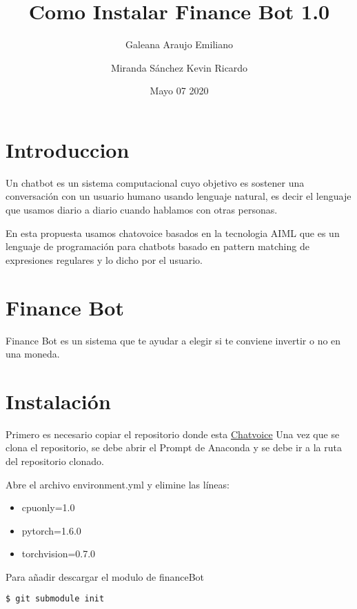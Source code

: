 \documentclass{article}
\title{\huge Como Instalar Finance Bot 1.0}
\author{Galeana Araujo Emiliano \and Miranda Sánchez Kevin Ricardo}
\date{Mayo 07 2020}
\begin{document}
\maketitle

\newpage

\section{Introduccion}

\justifying
Un chatbot es un sistema computacional cuyo objetivo es sostener una conversación con un usuario humano usando lenguaje natural, es decir el lenguaje que usamos diario a diario cuando hablamos con otras personas.\par

En esta propuesta usamos chatovoice basados en la tecnologia AIML que es un lenguaje de programación para chatbots basado en pattern matching de expresiones regulares y lo dicho por el usuario.

\section{Finance Bot}

\justifying
Finance Bot es un sistema que te ayudar a elegir si te conviene invertir o no en una moneda.

\newpage
\section{Instalación}

Primero es necesario copiar el repositorio donde esta \href{https://github.com/ivanvladimir/chatvoice}{Chatvoice}
Una vez que se clona el repositorio, se debe abrir el Prompt de Anaconda y se debe ir a la ruta del repositorio clonado.\par

Abre el archivo environment.yml y elimine las líneas:
\begin{itemize}
\item cpuonly=1.0
\item pytorch=1.6.0
\item torchvision=0.7.0
\end{itemize}

Para añadir descargar el modulo de financeBot
\begin{lstlisting}[frame=single,language=bash,caption=Crear ambiente]
  $ git submodule init
\end{lstlisting}
\end{document}
